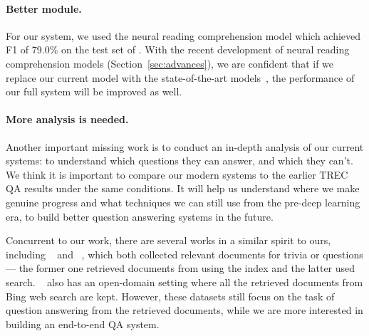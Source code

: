 \paragraph{Better  module.} For our  system, we used the neural reading comprehension model which achieved F1 of 79.0\% on the test set of . With the recent development of neural reading comprehension models (Section~\ref{sec:advances}), we are confident that if we replace our current  model with the state-of-the-art models~\cite{devlin2018bert}, the performance of our full system will be improved as well.

\paragraph{More analysis is needed.} Another important missing work is to conduct an in-depth analysis of our current systems: to understand which questions they can answer, and which they can't. We think it is important to compare our modern systems to the earlier TREC QA results under the same conditions. It will help us understand where we make genuine progress and what techniques we can still use from the pre-deep learning era, to build better question answering systems in the future.

Concurrent to our work, there are several works in a similar spirit to ours, including ~\cite{dunn2017searchqa} and ~\cite{dhingra2017quasar}, which both collected relevant documents for trivia or  questions --- the former one retrieved documents from  using the  index and the latter used  search. ~\cite{joshi2017triviaqa} also has an open-domain setting where all the retrieved documents from Bing web search are kept.
However, these datasets still focus on the task of question answering from the retrieved documents, while we are more interested in building an end-to-end QA system.
